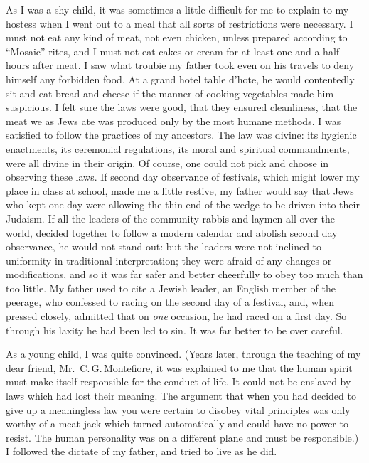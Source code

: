 As I was a shy child, it was sometimes a little
difficult for me to explain to my hostess when I went out
to a meal that all sorts of restrictions were necessary.
I must not eat any kind of meat, not even chicken,
unless prepared according to “Mosaic” rites, and I must
not eat cakes or cream for at least one and a half hours
after meat. I saw what troubie my father took even on
his travels to deny himself any forbidden food. At a
grand hotel table d’hote, he would contentedly sit and
eat bread and cheese if the manner of cooking vegetables
made him suspicious. I felt sure the laws were good,
that they ensured cleanliness, that the meat we as Jews
ate was produced only by the most humane methods. I
was satisfied to follow the practices of my ancestors.
The law was divine: its hygienic enactments, its ceremonial
regulations, its moral and spiritual commandments,
were all divine in their origin. Of course, one
could not pick and choose in observing these laws. If
second day observance of festivals, which might lower
my place in class at school, made me a little restive, my
father would say that Jews who kept one day were
allowing the thin end of the wedge to be driven into
their Judaism. If all the leaders of the community
rabbis and laymen all over the world, decided together
to follow a modern calendar and abolish second day
observance, he would not stand out: but the leaders were
not inclined to uniformity in traditional interpretation;
they were afraid of any changes or modifications, and so
it was far safer and better cheerfully to obey too much
than too little. My father used to cite a Jewish leader,
an English member of the peerage, who confessed to
racing on the second day of a festival, and, when pressed
closely, admitted that on \textsl{one} occasion, he had raced
on a first day. So through his laxity he had been led to
sin. It was far better to be over careful.

As a young child, I was quite convinced. (Years
later, through the teaching of my dear friend,
Mr.\ C.\,G.\,Montefiore, it was explained to me that the human spirit
must make itself responsible for the conduct of life. It
could not be enslaved by laws which had lost their
meaning. The argument that when you had decided to
give up a meaningless law you were certain to disobey
vital principles was only worthy of a meat jack which
turned automatically and could have no power to resist.
The human personality was on a different plane and must
be responsible.) I followed the dictate of my father,
and tried to live as he did.

